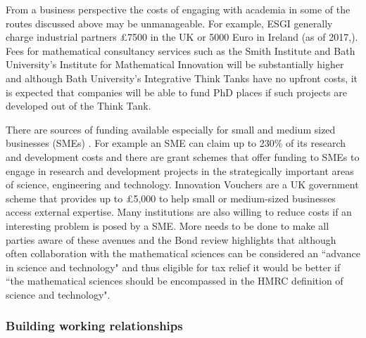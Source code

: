 \documentclass[11pt]{article} %
\begin{document}
	From a business perspective the costs of engaging with academia in some of the routes discussed above may be unmanageable. For example, ESGI generally charge industrial partners  £7500  in the UK or 5000  Euro  in Ireland (as of 2017,\cite{ESGIhandbook}). Fees for mathematical consultancy services such as the Smith Institute and Bath University's Institute for Mathematical Innovation will be substantially higher and although Bath University's Integrative Think Tanks have no upfront costs, it is expected that companies will be able to fund PhD places if such projects are developed out of the Think Tank. 
	
	There are sources of funding available especially for small and medium sized businesses (SMEs) \cite{IMI}. For example an SME can claim up to 230\% of its research and development costs \cite{Gov}  and there are grant schemes that offer funding to SMEs to engage in research and development projects in the strategically important areas of science, engineering and technology. Innovation Vouchers are a UK government scheme that	provides up to £5,000 to help small or medium-sized
	businesses access external expertise. Many institutions are also willing to reduce costs if an interesting problem is posed by a SME. More needs to be done to make all parties aware of these avenues and the Bond review \cite{Bond} highlights that although often collaboration with the mathematical sciences can be considered an ``advance in science and technology" and thus eligible for tax relief it would be better if ``the mathematical sciences should be encompassed in the HMRC definition of science and technology".
	
	
	\subsubsection{Building working relationships}
	
\end{document}
